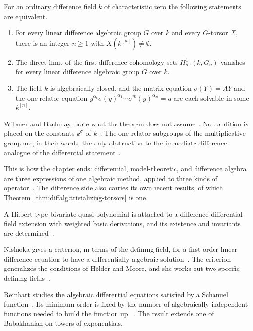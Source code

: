 \begin{theorem}\label{thm:diffalg:trivializing-torsors}
For an ordinary difference field $k$ of characteristic zero the following
statements are equivalent.
\begin{enumerate}
\item For every linear difference algebraic group $G$ over $k$ and every
$G$-torsor $X$, there is an integer $n \ge 1$ with $X(k^{[n]}) \neq \emptyset$.
\item The direct limit of the first difference cohomology sets
$H^1_{\sigma^n}(k, G_n)$ vanishes for every linear difference algebraic group
$G$ over $k$.
\item The field $k$ is algebraically closed, and the matrix equation
$\sigma(Y) = AY$ and the one-relator equation
$y^{\alpha_0}\sigma(y)^{\alpha_1}\cdots\sigma^m(y)^{\alpha_m} = a$ are each
solvable in some $k^{[n]}$.
\end{enumerate}
\end{theorem}

Wibmer and Bachmayr note what the theorem does not
assume~\cite[p.~3]{WibmerBachmayr2025}. No condition is placed on the
constants $k^\sigma$ of $k$~\cite[p.~3]{WibmerBachmayr2025}. The one-relator
subgroups of the multiplicative group are, in their words, the only
obstruction to the immediate difference analogue of the differential
statement~\cite[p.~3]{WibmerBachmayr2025}.

This is how the chapter ends: differential, model-theoretic, and difference
algebra are three expressions of one algebraic method, applied to three kinds
of operator~\cite[p.~912]{MikhalevPankratev1989}. The difference side also
carries its own recent results, of which
Theorem~\ref{thm:diffalg:trivializing-torsors} is one.

A Hilbert-type bivariate quasi-polynomial is attached to a
difference-differential field extension with weighted basic derivations, and
its existence and invariants are
determined~\cite{WlBivariateDimensionQuasiPolynom2020}.

Nishioka gives a criterion, in terms of the defining field, for a first order
linear difference equation to have a differentially algebraic solution~\cite{WlANoteOnDifferentiallyAlgebraic1984}. The
criterion generalizes the conditions of H\"older and Moore, and she works out
two specific
defining fields~\cite{WlANoteOnDifferentiallyAlgebraic1984}.

Reinhart studies the algebraic differential equations satisfied by a Schanuel
function~\cite{WlOnTheOrderOfAlgebraicDifferent1995}. Its minimum order is fixed by the number of algebraically
independent functions needed to build the function up
~\cite{WlOnTheOrderOfAlgebraicDifferent1995}. The result extends one
of
Babakhanian on towers of
exponentials.

